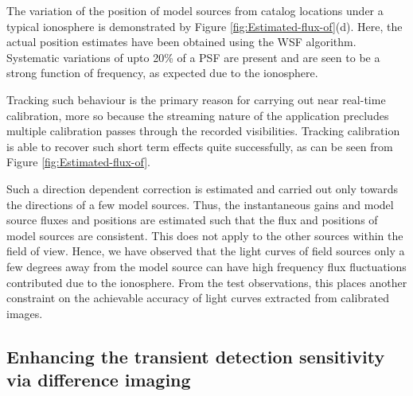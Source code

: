 \documentclass{aa}
\begin{document}
The variation  of the position of  model sources from catalog  locations under a
typical  ionosphere is  demonstrated  by Figure  \ref{fig:Estimated-flux-of}(d).
Here,  the  actual   position  estimates  have  been  obtained   using  the  WSF
algorithm. Systematic variations of upto 20\%  of a PSF are present and are seen
to be a strong function of frequency, as expected due to the ionosphere.




Tracking such  behaviour is the primary  reason for carrying  out near real-time
calibration, more so  because the streaming nature of  the application precludes
multiple  calibration   passes  through  the   recorded  visibilities.  Tracking
calibration is  able to recover such  short term effects  quite successfully, as
can be seen from Figure \ref{fig:Estimated-flux-of}.

Such a direction dependent correction  is estimated and carried out only towards
the directions of  a few model sources. Thus, the  instantaneous gains and model
source fluxes  and positions are estimated  such that the flux  and positions of
model sources  are consistent. This does  not apply to the  other sources within
the  field of  view. Hence,  we have  observed that  the light  curves  of field
sources only  a few degrees away from  the model source can  have high frequency
flux fluctuations contributed due to the ionosphere. From the test observations,
this  places another  constraint  on  the achievable  accuracy  of light  curves
extracted from calibrated images.


\subsection{\label{sub:Enhancing-the-transient}Enhancing the transient detection
sensitivity via difference imaging} 
\end{document}

